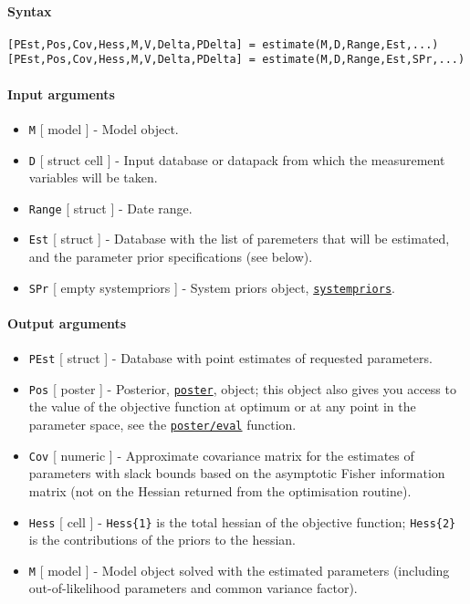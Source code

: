 


	\paragraph{Syntax}

\begin{verbatim}
[PEst,Pos,Cov,Hess,M,V,Delta,PDelta] = estimate(M,D,Range,Est,...)
[PEst,Pos,Cov,Hess,M,V,Delta,PDelta] = estimate(M,D,Range,Est,SPr,...)
\end{verbatim}

\paragraph{Input arguments}

\begin{itemize}
\item
  \texttt{M} {[} model {]} - Model object.
\item
  \texttt{D} {[} struct \textbar{} cell {]} - Input database or datapack
  from which the measurement variables will be taken.
\item
  \texttt{Range} {[} struct {]} - Date range.
\item
  \texttt{Est} {[} struct {]} - Database with the list of paremeters
  that will be estimated, and the parameter prior specifications (see
  below).
\item
  \texttt{SPr} {[} empty \textbar{} systempriors {]} - System priors
  object, \href{systempriors/Contents}{\texttt{systempriors}}.
\end{itemize}

\paragraph{Output arguments}

\begin{itemize}
\item
  \texttt{PEst} {[} struct {]} - Database with point estimates of
  requested parameters.
\item
  \texttt{Pos} {[} poster {]} - Posterior,
  \href{poster/Contents}{\texttt{poster}}, object; this object also
  gives you access to the value of the objective function at optimum or
  at any point in the parameter space, see the
  \href{poster/eval}{\texttt{poster/eval}} function.
\item
  \texttt{Cov} {[} numeric {]} - Approximate covariance matrix for the
  estimates of parameters with slack bounds based on the asymptotic
  Fisher information matrix (not on the Hessian returned from the
  optimisation routine).
\item
  \texttt{Hess} {[} cell {]} - \texttt{Hess\{1\}} is the total hessian
  of the objective function; \texttt{Hess\{2\}} is the contributions of
  the priors to the hessian.
\item
  \texttt{M} {[} model {]} - Model object solved with the estimated
  parameters (including out-of-likelihood parameters and common variance
  factor).
\end{itemize}

